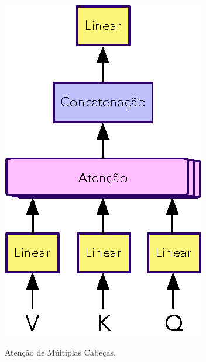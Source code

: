 \begin{frame}
	\begin{figure}[!ht]
		\centering
		\includegraphics[scale=0.75]{figs/multi_head_attention.eps}	
		\label{f.multi_head_attention}
		\caption{Atenção de Múltiplas Cabeças.}
	\end{figure}
\end{frame}
